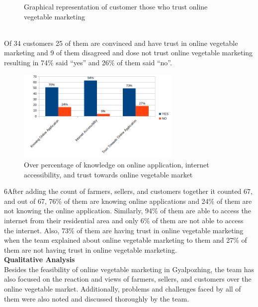 \documentclass[12pt]{report}
\begin{document}
\begin{normalsize}
\begin{figure}[h]
	\caption{ Graphical representation of customer those who trust online vegetable marketing }
	\label{myLabel}		%
	\end{figure}
\newline\\[0.1cm]Of 34 customers 25 of them are convinced and have trust in online vegetable marketing and 9 of them disagreed and dose not trust online vegetable marketing resulting in 74\% said “yes” and 26\% of them said “no”.\newline\\[0.1cm]
\newpage
\begin{figure}[h]       %
	\centering
	\includegraphics[width=0.7\textwidth]{finala.png}
	\caption{ Over percentage of knowledge on online application, internet accessibility, and trust towards online vegetable market }
	\label{myLabel}		%
	\end{figure}
\newline6After adding the count of farmers, sellers, and customers together it counted 67, and out of 67, 76\% of them are knowing online applications and 24\% of them are not knowing the online application. Similarly, 94\% of them are able to access the internet from their residential area and only 6\% of them are not able to access the internet. Also, 73\% of them are having trust in online vegetable marketing when the team explained about online vegetable marketing  to them and 27\% of them are not having trust in online vegetable marketing.\newline\\[0.1cm]
{\bfseries Qualitative Analysis}\newline\\[0.1cm]
Besides the feasibility of online vegetable marketing in Gyalpozhing, the team has also focused on the reaction and views of farmers, sellers, and customers over the online vegetable market. Additionally, problems and challenges faced by all of them were also noted and discussed thoroughly by the team.\newline\\[0.1cm]

\end{normalsize}
\end{document}

